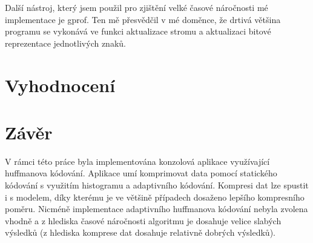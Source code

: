 \documentclass[11pt,a4paper,titlepage]{article}
\begin{document}
            Další nástroj, který jsem použil pro zjištění velké časové náročnosti mé implementace je gprof. Ten mě přesvědčil v mé doměnce,
            že drtivá většina programu se vykonává ve funkci aktualizace stromu a aktualizaci bitové reprezentace jednotlivých znaků.

    \section{Vyhodnocení}

    \section{Závěr}
        V rámci této práce byla implementována konzolová aplikace využívající huffmanova kódování. Aplikace umí komprimovat data pomocí
        statického kódování s využitím histogramu a adaptivního kódování. Kompresi dat lze spustit i s modelem, díky kterému je ve většině
        případech dosaženo lepšího kompresního poměru. Nicméně implementace adaptivního huffmanova kódování nebyla zvolena vhodně a z hlediska
        časové náročnosti algoritmu je dosahuje velice slabých výsledků (z hlediska komprese dat dosahuje relativně dobrých výsledků).
\end{document}
